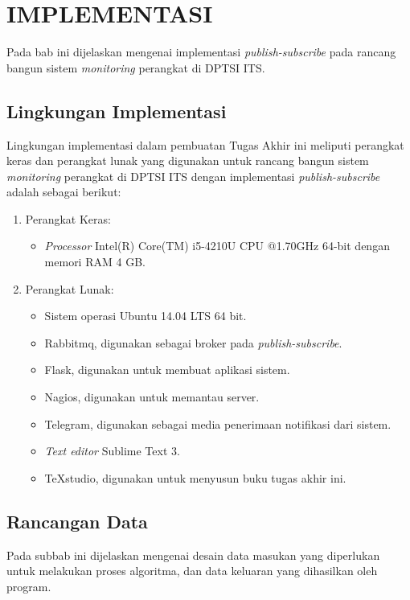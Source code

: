 \chapter{IMPLEMENTASI}
\label{chapter:implementasi}

Pada bab ini dijelaskan mengenai implementasi \textit{publish-subscribe} pada rancang bangun sistem \textit{monitoring} perangkat di DPTSI ITS.

\section{Lingkungan Implementasi}
Lingkungan implementasi dalam pembuatan Tugas Akhir ini meliputi perangkat keras dan perangkat lunak yang digunakan untuk rancang bangun sistem \textit{monitoring} perangkat di DPTSI ITS dengan implementasi \textit{publish-subscribe} adalah sebagai berikut:

\begin{enumerate}
	\item Perangkat Keras:
		\begin{itemize}
			\item \textit{Processor} Intel(R) Core(TM) i5-4210U CPU @1.70GHz 64-bit dengan memori RAM 4 GB.
		\end{itemize}
	\item Perangkat Lunak:
	\begin{itemize}
		\item Sistem operasi Ubuntu 14.04 LTS 64 bit.
		\item Rabbitmq, digunakan sebagai broker pada \textit{publish-subscribe}.
		\item Flask, digunakan untuk membuat aplikasi sistem.
		\item Nagios, digunakan untuk memantau server.
		\item Telegram, digunakan sebagai media penerimaan notifikasi dari sistem.
		\item \textit{Text editor} Sublime Text 3.
		\item TeXstudio, digunakan untuk menyusun buku tugas akhir ini.
		
	\end{itemize}			
\end{enumerate}


\section{Rancangan Data}
Pada subbab ini dijelaskan mengenai desain data masukan yang diperlukan untuk melakukan proses algoritma, dan data keluaran yang dihasilkan oleh program.

